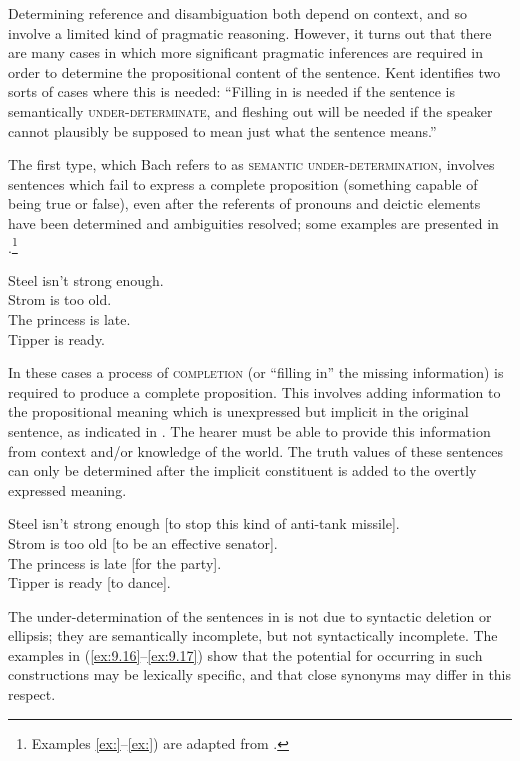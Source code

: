 Determining reference and disambiguation both depend on context, and so involve a limited kind of pragmatic reasoning. However, it turns out that there are many cases in which more significant pragmatic inferences are required in order to determine the propositional content of the sentence. Kent \citet{Bach1994} identifies two sorts of cases where this is needed: “Filling in is needed if the sentence is semantically \textsc{under-determinate}, and fleshing out will be needed if the speaker cannot plausibly be supposed to mean just what the sentence means.”



The first type, which Bach refers to as \textsc{semantic under-determination}, involves sentences which fail to express a complete proposition (something capable of being true or false), even after the referents of pronouns and deictic elements have been determined and ambiguities resolved; some examples are presented in .\footnote{Examples \ref{ex:}–\ref{ex:}) are adapted from \citet{Bach1994}.}


\ea \label{ex:9.14}
\ea Steel isn’t strong enough.\\
\ex Strom is too old.\\
\ex The princess is late.\\
\ex Tipper is ready.
                       \z
\z


In these cases a process of \textsc{completion} (or “filling in” the missing information) is required to produce a complete proposition. This involves adding information to the propositional meaning which is unexpressed but implicit in the original sentence, as indicated in . The hearer must be able to provide this information from context and/or knowledge of the world. The truth values of these sentences can only be determined after the implicit constituent is added to the overtly expressed meaning.


\ea \label{ex:9.15}
\ea Steel isn’t strong enough [to stop this kind of anti-tank missile].\\
\ex Strom is too old [to be an effective senator].\\
\ex The princess is late [for the party].\\
\ex Tipper is ready [to dance].
                       \z
\z


The under-determination of the sentences in  is not due to syntactic deletion or ellipsis; they are semantically incomplete, but not syntactically incomplete. The examples in (\ref{ex:9.16}--\ref{ex:9.17}) show that the potential for occurring in such constructions may be lexically specific, and that close synonyms may differ in this respect.


